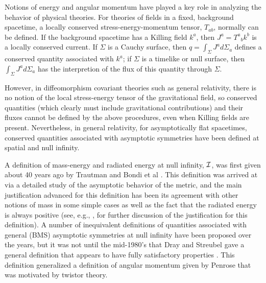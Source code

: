 Notions of energy and angular momentum have played a key role in
analyzing the behavior of physical theories. For theories of fields in
a fixed, background spacetime, a locally conserved
stress-energy-momentum tensor, $T_{ab}$, normally can be defined. If the
background spacetime has a Killing field $k^a$, then $J^a = {T^a}_b
k^b$ is a locally conserved current. If $\Sigma$ is a Cauchy surface,
then $q = \int_\Sigma J^a d \Sigma_a$ defines a conserved quantity
associated with $k^a$; if $\Sigma$ is a timelike or null surface, then
$\int_\Sigma J^a d \Sigma_a$ has the interpretion of the flux of this
quantity through $\Sigma$.

However, in diffeomorphism covariant theories such as general
relativity, there is no notion of the local stress-energy tensor of
the gravitational field, so conserved quantities (which clearly must
include gravitational contributions) and their fluxes cannot be
defined by the above procedures, even when Killing fields are
present. Nevertheless, in general relativity, for asymptotically flat
spacetimes, conserved quantities associated with asymptotic symmetries
have been defined at spatial and null infinity.

A definition of mass-energy and radiated energy at null infinity,
${\cal I}$, was first given about 40 years ago by Trautman \cite{t}
and Bondi et al \cite{b}. This definition was arrived at via a
detailed study of the asymptotic behavior of the metric, and the main
justification advanced for this definition has been its agreement with
other notions of mass in some simple cases as well as the fact that
the radiated energy is always positive (see, e.g., \cite{g},
\cite{cjm} for further discussion of the justification for this
definition). A number of inequivalent definitions of quantities
associated with general (BMS) asymptotic symmetries at null infinity
have been proposed over the years, but it was not until the mid-1980's
that Dray and Streubel \cite{ds} gave a general definition that
appears to have fully satisfactory properties \cite{s}. This
definition generalized a definition of angular momentum given by
Penrose \cite{p} that was motivated by twistor theory.

